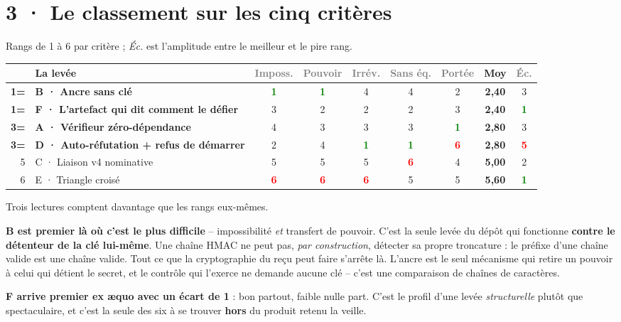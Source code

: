 \documentclass[10pt]{article}
\newcommand{\best}[1]{\textcolor{green}{\textbf{#1}}}
\newcommand{\pire}[1]{\textcolor{red}{\textbf{#1}}}
\newcommand{\sz}[1]{\textcolor{grey}{\small\textsf{#1}}}
\begin{document}
\section{3 · Le classement sur les cinq critères}

Rangs de 1 à 6 par critère ; \emph{Éc.} est l'amplitude entre le meilleur et le pire rang.

\renewcommand{\arraystretch}{1.16}
\begin{center}\small
\begin{tabular}{@{}r >{\raggedright\arraybackslash}p{7.0cm} ccccc c c@{}}
\toprule
& \textbf{La levée} & \sz{Imposs.} & \sz{Pouvoir} & \sz{Irrév.} & \sz{Sans éq.} & \sz{Portée} & \textbf{Moy} & \sz{Éc.} \\
\midrule
\textbf{1=} & \textbf{B · Ancre sans clé} & \best{1} & \best{1} & 4 & 4 & 2 & \textbf{2,40} & 3 \\
\textbf{1=} & \textbf{F · L'artefact qui dit comment le défier} & 3 & 2 & 2 & 2 & 3 & \textbf{2,40} & \best{1} \\
\textbf{3=} & \textbf{A · Vérifieur zéro-dépendance} & 4 & 3 & 3 & 3 & \best{1} & \textbf{2,80} & 3 \\
\textbf{3=} & \textbf{D · Auto-réfutation + refus de démarrer} & 2 & 4 & \best{1} & \best{1} & \pire{6} & \textbf{2,80} & \pire{5} \\
5 & C · Liaison v4 nominative & 5 & 5 & 5 & \pire{6} & 4 & \textbf{5,00} & 2 \\
6 & E · Triangle croisé & \pire{6} & \pire{6} & \pire{6} & 5 & 5 & \textbf{5,60} & \best{1} \\
\bottomrule
\end{tabular}
\end{center}

Trois lectures comptent davantage que les rangs eux-mêmes.

\textbf{B est premier là où c'est le plus difficile} -- impossibilité \emph{et} transfert de pouvoir.
C'est la seule levée du dépôt qui fonctionne \textbf{contre le détenteur de la clé lui-même}. Une
chaîne HMAC ne peut pas, \emph{par construction}, détecter sa propre troncature : le préfixe d'une
chaîne valide est une chaîne valide. Tout ce que la cryptographie du reçu peut faire s'arrête là.
L'ancre est le seul mécanisme qui retire un pouvoir à celui qui détient le secret, et le contrôle qui
l'exerce ne demande aucune clé -- c'est une comparaison de chaînes de caractères.

\textbf{F arrive premier ex \ae quo avec un écart de 1} : bon partout, faible nulle part. C'est le
profil d'une levée \emph{structurelle} plutôt que spectaculaire, et c'est la seule des six à se
trouver \textbf{hors} du produit retenu la veille.
\end{document}
